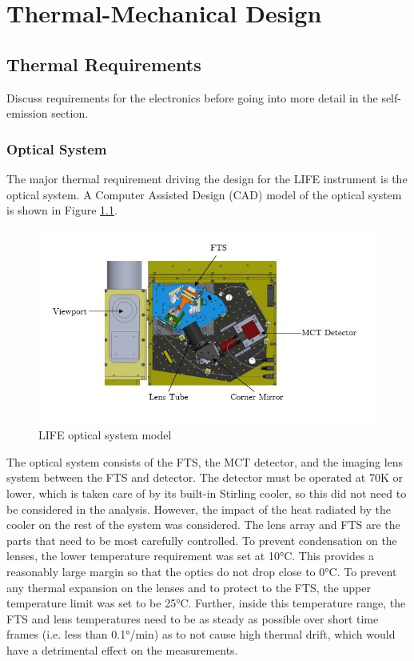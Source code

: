 \chapter{Thermal-Mechanical Design}  \label{thermal}

\section{Thermal Requirements}
Discuss requirements for the electronics before going into more detail in the self-emission section.

\subsection{Optical System}
The major thermal requirement driving the design for the LIFE instrument is the optical system. A Computer Assisted Design (CAD) model of the optical system is shown in Figure \ref{fig:optical_system_diagram}.

\begin{figure}[h]
\centering
  \includegraphics[width=\linewidth]{chap4_images/optical_system_diagram.JPG}
  \caption{LIFE optical system model}
  \label{fig:optical_system_diagram}
\end{figure}

The optical system consists of the FTS, the MCT detector, and the imaging lens system between the FTS and detector. The detector must be operated at 70K or lower, which is taken care of by its built-in Stirling cooler, so this did not need to be considered in the analysis. However, the impact of the heat radiated by the cooler on the rest of the system was considered. The lens array and FTS are the parts that need to be most carefully controlled. To prevent condensation on the lenses, the lower temperature requirement was set at 10°C. This provides a reasonably large margin so that the optics do not drop close to 0°C. To prevent any thermal expansion on the lenses and to protect to the FTS, the upper temperature limit was set to be 25°C. Further, inside this temperature range, the FTS and lens temperatures need to be as steady as possible over short time frames (i.e. less than 0.1°/min) as to not cause high thermal drift, which would have a detrimental effect on the measurements. 


